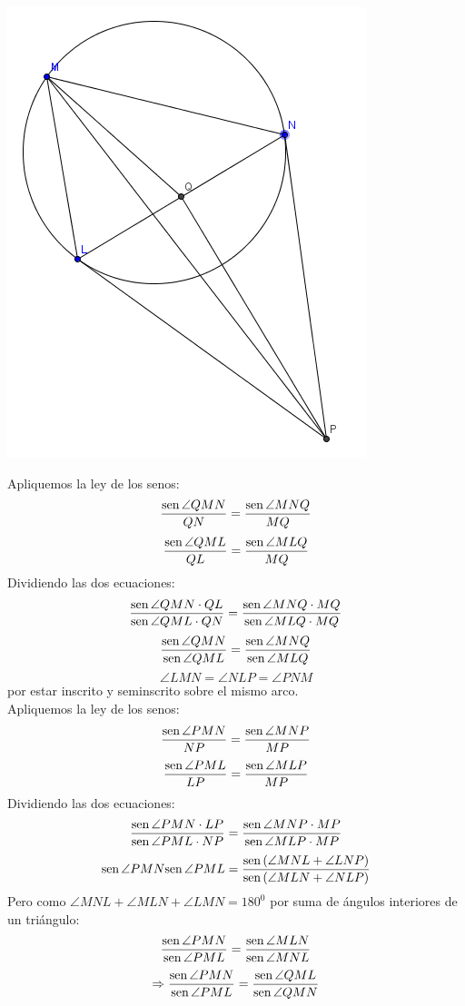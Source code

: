 \documentclass{book}
\newcommand{\sen}{\mathop{\rm sen}\nolimits} %
\begin{document}
\begin{enumerate}
					\begin{center}
							\includegraphics[scale=1]{imagenes/Geometria/25,2.png}
					\end{center}
					Apliquemos la ley de los senos:
$${\sen {\angle QMN}\over QN}={\sen {\angle MNQ}\over MQ}$$
$${\sen {\angle QML}\over QL}={\sen {\angle MLQ}\over MQ}$$
Dividiendo las dos ecuaciones:
$$\frac{\sen {\angle QMN}\cdot QL}{\sen {\angle QML}\cdot QN}=\frac{\sen {\angle MNQ}\cdot MQ}{\sen {\angle MLQ}\cdot MQ}$$
$$\frac{\sen {\angle QMN}}{\sen {\angle QML}}=\frac{\sen {\angle MNQ}}{\sen {\angle MLQ}}$$
$$\angle LMN=\angle NLP=\angle PNM$$
por estar inscrito y seminscrito sobre el mismo arco.\\
Apliquemos la ley de los senos:
$${\sen {\angle PMN}\over NP}={\sen {\angle MNP}\over MP}$$
$${\sen {\angle PML}\over LP}={\sen {\angle MLP}\over MP}$$
Dividiendo las dos ecuaciones:
$$\frac{\sen {\angle PMN}\cdot LP}{\sen {\angle PML}\cdot NP}=\frac{\sen {\angle MNP}\cdot MP}{\sen {\angle MLP}\cdot MP}$$
$${\sen {\angle PMN}}{\sen {\angle PML}}=\frac{\sen {(\angle MNL+\angle LNP)}}{\sen {(\angle MLN+\angle NLP)}}$$
Pero como $\angle MNL+\angle MLN+\angle LMN=180^0$ por suma de ángulos interiores de un triángulo:
$$\frac{\sen {\angle PMN}}{\sen {\angle PML}}=\frac{\sen {\angle MLN}}{\sen {\angle MNL}}$$
$$\Rightarrow\frac{\sen {\angle PMN}}{\sen {\angle PML}}=\frac{\sen {\angle QML}}{\sen {\angle QMN}}$$

\end{enumerate}
\end{document}
